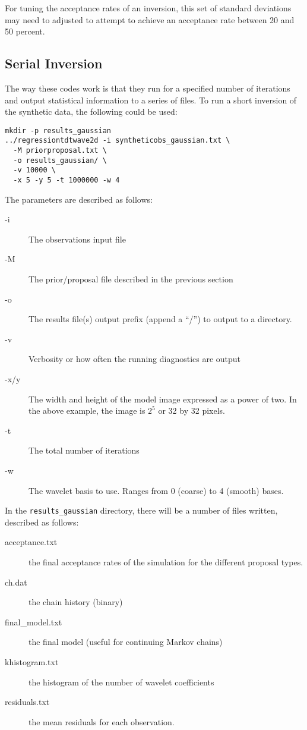 \documentclass[a4paper,12pt]{article}
\begin{document}
For tuning the acceptance rates of an inversion, this set of standard
deviations may need to adjusted to attempt to achieve an acceptance
rate between 20 and 50 percent. 

\subsection{Serial Inversion}

The way these codes work is that they run for a specified number of
iterations and output statistical information to a series of files.
To run a short inversion of the synthetic data, the following
could be used:

\begin{verbatim}
mkdir -p results_gaussian
../regressiontdtwave2d -i syntheticobs_gaussian.txt \
  -M priorproposal.txt \
  -o results_gaussian/ \
  -v 10000 \
  -x 5 -y 5 -t 1000000 -w 4
\end{verbatim}

The parameters are described as follows:

\begin{description}
\item [-i] The observations input file
\item [-M] The prior/proposal file described in the previous section
\item [-o] The results file(s) output prefix (append a ``/'') to output to a
  directory.
\item [-v] Verbosity or how often the running diagnostics are output
\item [-x/y] The width and height of the model image expressed as a power of two. In
  the above example, the image is $2^5$ or 32 by 32 pixels.
\item [-t] The total number of iterations
\item [-w] The wavelet basis to use. Ranges from 0 (coarse) to 4 (smooth) bases.
\end{description}

In the {\tt results\_gaussian} directory, there will be a number of files written,
described as follows:

\begin{description}
\item[acceptance.txt] the final acceptance rates of the simulation for the different
  proposal types.
\item[ch.dat] the chain history (binary)
\item[final\_model.txt] the final model (useful for continuing Markov chains)
\item[khistogram.txt] the histogram of the number of wavelet coefficients
\item[residuals.txt] the mean residuals for each observation.
\end{description}
\end{document}
